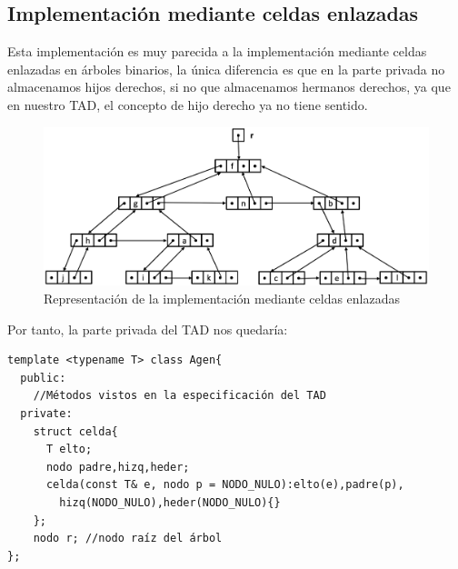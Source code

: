 \subsection{Implementación mediante celdas enlazadas}
Esta implementación es muy parecida a la implementación mediante celdas enlazadas en árboles binarios, la única diferencia es que en la parte privada no almacenamos hijos derechos, si no que almacenamos hermanos derechos, ya que en nuestro TAD, el concepto de hijo derecho ya no tiene sentido.

\begin{figure}[h]
  \begin{center}
    \includegraphics[width=.7\textwidth]{assets/AgenEnla.png}
  \end{center}
  \caption{Representación de la implementación mediante celdas enlazadas}
\end{figure}

Por tanto, la parte privada del TAD nos quedaría:
\begin{verbatim}
template <typename T> class Agen{
  public:
    //Métodos vistos en la especificación del TAD
  private:
    struct celda{
      T elto;
      nodo padre,hizq,heder;
      celda(const T& e, nodo p = NODO_NULO):elto(e),padre(p),
        hizq(NODO_NULO),heder(NODO_NULO){}
    };
    nodo r; //nodo raíz del árbol
};
\end{verbatim}


